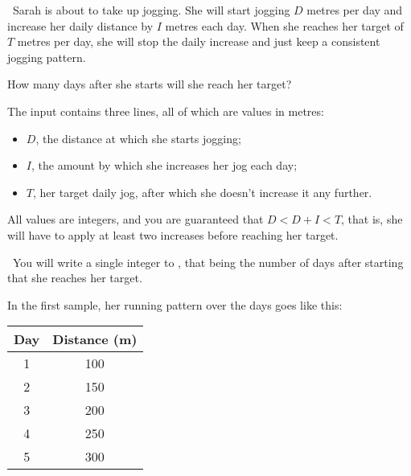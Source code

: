 

\Question\ Sarah is about to take up jogging. She will start jogging $D$ metres per day
and increase her daily distance by $I$ metres each day. When she reaches her target of $T$
metres per day, she will stop the daily increase and just keep a consistent jogging
pattern.

How many days after she starts will she reach her target?

\Input

The input contains three lines, all of which are values in metres:
\begin{itemize}
  \item $D$, the distance at which she starts jogging;
  \item $I$, the amount by which she increases her jog each day;
  \item $T$, her target daily jog, after which she doesn't increase it any further.
\end{itemize}

All values are integers, and you are guaranteed that $D < D+I < T$, that is, she will have
to apply at least two increases before reaching her target.

\Output\ You will write a single integer to \OUT, that being the number of days after
starting that she reaches her target.

\Sample



\Explanation In the first sample, her running pattern over the days goes like this:

\begin{inlinetable*}
  \begin{tabular}{cc}
    \toprule
    Day & Distance (m) \\
    \midrule
    1   & 100          \\
    2   & 150          \\
    3   & 200          \\
    4   & 250          \\
    5   & 300          \\
    \bottomrule
  \end{tabular}
\end{inlinetable*}

